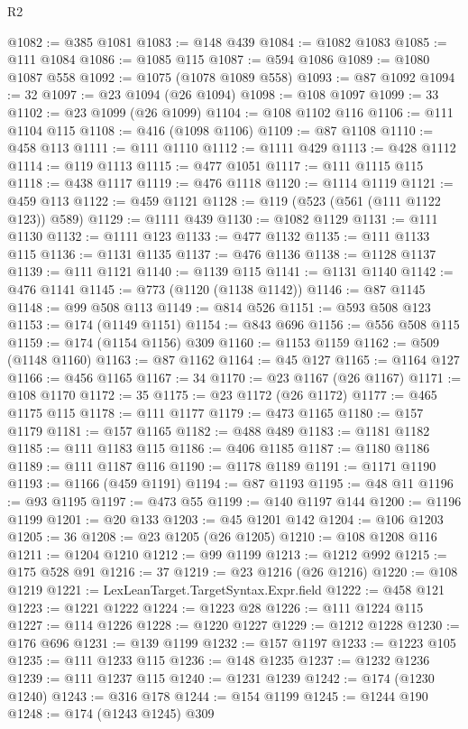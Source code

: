 \begin{lexlean}{R2}
\begin{coremodule}
{{{{{{{{{{{{{{{{{{{{{{{{{{{{{{{{{{{{{{{{{{{{{{{{{{{{{{{{{{{{{{{{{{{{{{{{{{{{{{{{{{{{{{{{{{{{{{{{{{{{{{{{{{{{{{{{{{{{{{{{{{{{{{{{{{{{{{{{{{{{@1082 := @385 @1081
@1083 := @148 @439
@1084 := @1082 @1083
@1085 := @111 @1084
@1086 := @1085 @115
@1087 := @594 @1086
@1089 := @1080 @1087 @558
@1092 := @1075 (@1078 @1089 @558)
@1093 := @87 @1092
@1094 := 32
@1097 := @23 @1094 (@26 @1094)
@1098 := @108 @1097
@1099 := 33
@1102 := @23 @1099 (@26 @1099)
@1104 := @108 @1102 @116
@1106 := @111 @1104 @115
@1108 := @416 (@1098 @1106)
@1109 := @87 @1108
@1110 := @458 @113
@1111 := @111 @1110
@1112 := @1111 @429
@1113 := @428 @1112
@1114 := @119 @1113
@1115 := @477 @1051
@1117 := @111 @1115 @115
@1118 := @438 @1117
@1119 := @476 @1118
@1120 := @1114 @1119
@1121 := @459 @113
@1122 := @459 @1121
@1128 := @119 (@523 (@561 (@111 @1122 @123)) @589)
@1129 := @1111 @439
@1130 := @1082 @1129
@1131 := @111 @1130
@1132 := @1111 @123
@1133 := @477 @1132
@1135 := @111 @1133 @115
@1136 := @1131 @1135
@1137 := @476 @1136
@1138 := @1128 @1137
@1139 := @111 @1121
@1140 := @1139 @115
@1141 := @1131 @1140
@1142 := @476 @1141
@1145 := @773 (@1120 (@1138 @1142))
@1146 := @87 @1145
@1148 := @99 @508 @113
@1149 := @814 @526
@1151 := @593 @508 @123
@1153 := @174 (@1149 @1151)
@1154 := @843 @696
@1156 := @556 @508 @115
@1159 := @174 (@1154 @1156) @309
@1160 := @1153 @1159
@1162 := @509 (@1148 @1160)
@1163 := @87 @1162
@1164 := @45 @127
@1165 := @1164 @127
@1166 := @456 @1165
@1167 := 34
@1170 := @23 @1167 (@26 @1167)
@1171 := @108 @1170
@1172 := 35
@1175 := @23 @1172 (@26 @1172)
@1177 := @465 @1175 @115
@1178 := @111 @1177
@1179 := @473 @1165
@1180 := @157 @1179
@1181 := @157 @1165
@1182 := @488 @489
@1183 := @1181 @1182
@1185 := @111 @1183 @115
@1186 := @406 @1185
@1187 := @1180 @1186
@1189 := @111 @1187 @116
@1190 := @1178 @1189
@1191 := @1171 @1190
@1193 := @1166 (@459 @1191)
@1194 := @87 @1193
@1195 := @48 @11
@1196 := @93 @1195
@1197 := @473 @55
@1199 := @140 @1197 @144
@1200 := @1196 @1199
@1201 := @20 @133
@1203 := @45 @1201 @142
@1204 := @106 @1203
@1205 := 36
@1208 := @23 @1205 (@26 @1205)
@1210 := @108 @1208 @116
@1211 := @1204 @1210
@1212 := @99 @1199
@1213 := @1212 @992
@1215 := @175 @528 @91
@1216 := 37
@1219 := @23 @1216 (@26 @1216)
@1220 := @108 @1219
@1221 := LexLeanTarget.TargetSyntax.Expr.field
@1222 := @458 @121
@1223 := @1221 @1222
@1224 := @1223 @28
@1226 := @111 @1224 @115
@1227 := @114 @1226
@1228 := @1220 @1227
@1229 := @1212 @1228
@1230 := @176 @696
@1231 := @139 @1199
@1232 := @157 @1197
@1233 := @1223 @105
@1235 := @111 @1233 @115
@1236 := @148 @1235
@1237 := @1232 @1236
@1239 := @111 @1237 @115
@1240 := @1231 @1239
@1242 := @174 (@1230 @1240)
@1243 := @316 @178
@1244 := @154 @1199
@1245 := @1244 @190
@1248 := @174 (@1243 @1245) @309
}}}}}}}}}}}}}}}}}}}}}}}}}}}}}}}}}}}}}}}}}}}}}}}}}}}}}}}}}}}}}}}}}}}}}}}}}}}}}}}}}}}}}}}}}}}}}}}}}}}}}}}}}}}}}}}}}}}}}}}}}}}}}}}}}}}}}}}}}}}}
\end{coremodule}
\end{lexlean}
